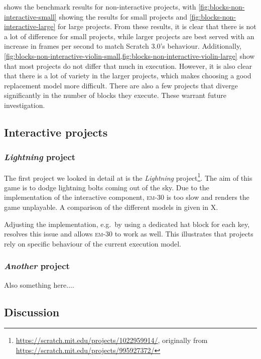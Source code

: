 \documentclass[../main]{subfiles}
\begin{document}
 shows the benchmark results for non-interactive projects, with \cref{fig:blocks-non-interactive-small} showing the results for small projects and \cref{fig:blocks-non-interactive-large} for large projects.
From these results, it is clear that there is not a lot of difference for small projects, while larger projects are best served with an increase in frames per second to match Scratch 3.0's behaviour.
Additionally, \cref{fig:blocks-non-interactive-violin-small,fig:blocks-non-interactive-violin-large} show that most projects do not differ that much in execution.
However, it is also clear that there is a lot of variety in the larger projects, which makes choosing a good replacement model more difficult.
There are also a few projects that diverge significantly in the number of blocks they execute.
These warrant future investigation.

\subsection{Interactive projects}\label{subsec:interactive-projects}

\subsubsection{\textit{Lightning} project}

The first project we looked in detail at is the \textit{Lightning} project\footnote{\url{https://scratch.mit.edu/projects/1022959914/}, originally from \url{https://scratch.mit.edu/projects/995927372/}}.
The aim of this game is to dodge lightning bolts coming out of the sky.
Due to the implementation of the interactive component, \textsc{em-30} is too slow and renders the game unplayable.
A comparison of the different models in given in X.

Adjusting the implementation, e.g.\ by using a dedicated hat block for each key, resolves this issue and allows \textsc{em-30} to work as well.
This illustrates that projects rely on specific behaviour of the current execution model.

\subsubsection{\textit{Another} project}

Also something here....

\subsection{Discussion}\label{subsec:discussion}
\end{document}
